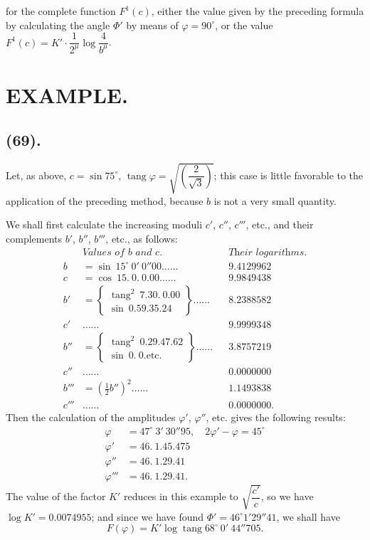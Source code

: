 \documentclass{article}
\begin{document}
for the complete function $F^{1}(c)$, either the value given by the preceding formula by calculating the angle $\Phi'$ by means of $\varphi=90^{\circ}$, or the value $F^{1}(c)=K'\cdot\dfrac{1}{2^{\mu}}\log\dfrac{4}{b^{\mu}}$.

\section*{EXAMPLE.}

\subsection*{(69).}

Let, as above, $c=\sin75^{\circ}$, $\operatorname{tang}\varphi=\sqrt{\left(\dfrac{2}{\sqrt{3}}\right)}$; this case is little favorable to the application of the preceding method, because $b$ is not a very small quantity.

We shall first calculate the increasing moduli $c'$, $c''$, $c'''$, etc., and their complements $b'$, $b''$, $b'''$, etc., as follows:
\[ \begin{aligned} &\textit{Values of $b$ and $c$.} && \textit{Their logarithms.}\\ b&=\sin\ 15^{\circ}\ 0'\ 0''00\ldots\ldots && 9.4129962\\ c&=\cos\ 15.\ 0.\ 0.00\ldots\ldots && 9.9849438\\ b'&=\left\{\begin{array}{l}\operatorname{tang}^{2}\ 7.30.\ 0.00\\ \sin\ 0.59.35.24\end{array}\right\}\ldots\ldots && 8.2388582\\ c'&\ldots\ldots && 9.9999348\\ b''&=\left\{\begin{array}{l}\operatorname{tang}^{2}\ 0.29.47.62\\ \sin\ 0.\ 0.\text{etc.}\end{array}\right\}\ldots\ldots && 3.8757219\\ c''&\ldots\ldots && 0.0000000\\ b'''&=(\tfrac{1}{2}b'')^{2}\ldots\ldots && 1.1493838\\ c'''&\ldots\ldots && 0.0000000. \end{aligned} \]
Then the calculation of the amplitudes $\varphi'$, $\varphi''$, etc. gives the following results:
\[ \begin{aligned} \varphi&=47^{\circ}\ 3'\ 30''95,\quad 2\varphi'-\varphi=45^{\circ}\\ \varphi'&=46.\ 1.45.475\\ \varphi''&=46.\ 1.29.41\\ \varphi'''&=46.\ 1.29.41. \end{aligned} \]
The value of the factor $K'$ reduces in this example to $\sqrt{\dfrac{c'}{c}}$, so we have $\log K'=0.0074955$; and since we have found $\Phi'=46^{\circ}1'29''41$, we shall have
\[ F(\varphi)=K'\log\operatorname{tang}68^{\circ}\ 0'\ 44''705. \]
\end{document}
